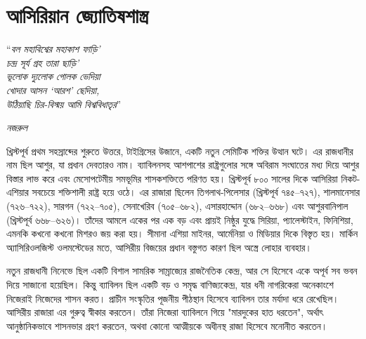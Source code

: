 \chapter{আসিরিয়ান জ্যোতিষশাস্ত্র}

\epigraph{``\textit{বল মহাবিশ্বের মহাকাশ ফাড়ি’\\
চন্দ্র সূর্য গ্রহ তারা ছাড়ি’\\
ভূলোক দ্যুলোক গোলক ভেদিয়া\\
খোদার আসন ‘আরশ’ ছেদিয়া,\\
উঠিয়াছি চির-বিস্ময় আমি বিশ্ববিধাতৃর}''}{\textit{নজরুল}}


খ্রিস্টপূর্ব প্রথম সহস্রাব্দের শুরুতে উত্তরে, টাইগ্রিসের উজানে, একটি নতুন সেমিটিক শক্তির উত্থান ঘটে। এর রাজধানীর নাম ছিল আশুর, যা প্রধান দেবতারও নাম। ব্যাবিলনসহ আশপাশের রাষ্ট্রগুলোর সঙ্গে অবিরাম সংঘাতের মধ্য দিয়ে আশুর বিস্তার লাভ করে এবং মেসোপটেমীয় সমভূমির শাসকশক্তিতে পরিণত হয়। খ্রিস্টপূর্ব ৮০০ সালের দিকে আসিরিয়া নিকট-এশিয়ার সবচেয়ে শক্তিশালী রাষ্ট্র হয়ে ওঠে। এর রাজারা ছিলেন তিগলাথ-পিলেসার (খ্রিস্টপূর্ব ৭৪৫–৭২৭), শালমানেসার (৭২৬–৭২২), সারগন (৭২২–৭০৫), সেনাখেরিব (৭০৫–৬৮২), এসারহাদ্দোন (৬৮২–৬৬৮) এবং আশুরবানিপাল (খ্রিস্টপূর্ব ৬৬৮–৬২৬)। তাঁদের আমলে একের পর এক বড় এবং প্রায়ই নিষ্ঠুর যুদ্ধে সিরিয়া, প্যালেস্টাইন, ফিনিশিয়া, এমনকি কখনো কখনো মিশরও জয় করা হয়। সীমানা এশিয়া মাইনর, আর্মেনিয়া ও মিডিয়ার দিকে বিস্তৃত হয়। মার্কিন অ্যাসিরিওলজিস্ট ওলমস্টেডের মতে, আসিরীয় বিজয়ের প্রধান বস্তুগত কারণ ছিল অস্ত্রে লোহার ব্যবহার।

নতুন রাজধানী নিনেভে ছিল একটি বিশাল সামরিক সাম্রাজ্যের রাজনৈতিক কেন্দ্র, আর সে হিসেবে একে অপূর্ব সব ভবন দিয়ে সাজানো হয়েছিল। কিন্তু ব্যাবিলন ছিল একটি বড় ও সমৃদ্ধ বাণিজ্যকেন্দ্র, যার ধনী নাগরিকেরা অনেকাংশে নিজেরাই নিজেদের শাসন করত। প্রাচীন সংস্কৃতির পূজনীয় পীঠস্থান হিসেবে ব্যাবিলন তার মর্যাদা ধরে রেখেছিল। আসিরীয় রাজারা এর গুরুত্ব স্বীকার করতেন। তাঁরা নিজেরা ব্যাবিলনে গিয়ে "মারদুকের হাত ধরতেন", অর্থাৎ আনুষ্ঠানিকভাবে শাসনভার গ্রহণ করতেন, অথবা কোনো আত্মীয়কে অধীনস্থ রাজা হিসেবে মনোনীত করতেন।

